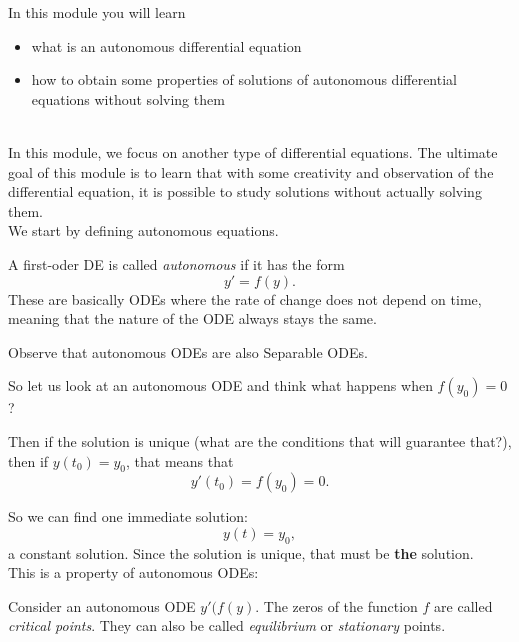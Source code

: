 In this module you will learn
\begin{itemize}
	\item what is an autonomous differential equation
	\item how to obtain some properties of solutions of autonomous differential equations without solving them
\end{itemize}

\hfill \\




In this module, we focus on another type of differential equations.
The ultimate goal of this module is to learn that with some creativity and observation of the differential equation, it is possible to study solutions without actually solving them. \\


We start by defining autonomous equations.



\begin{definition}
A first-oder DE is called \emph{autonomous} if it has the form
$$
y' = f(y).
$$
These are basically ODEs where the rate of change does not depend on time, meaning that the nature of the ODE always stays the same.

\end{definition}


\begin{graybox}
Observe that autonomous ODEs are also Separable ODEs.	
\end{graybox}


So let us look at an autonomous ODE and think what happens when $f(y_0)=0$?

Then if the solution is unique (what are the conditions that will guarantee that?), then if $y(t_0)=y_0$, that means that
$$
y'(t_0) = f(y_0)=0.
$$

So we can find one immediate solution:
$$
y(t) = y_0,
$$
a constant solution. Since the solution is unique, that must be \textbf{the} solution. \\


This is a property of autonomous ODEs:

\begin{definition}
Consider an autonomous ODE \quad $y'(f(y)$.
The zeros of the function $f$ are called \emph{critical points}. They can also be called \emph{equilibrium} or \emph{stationary} points.
\end{definition}

